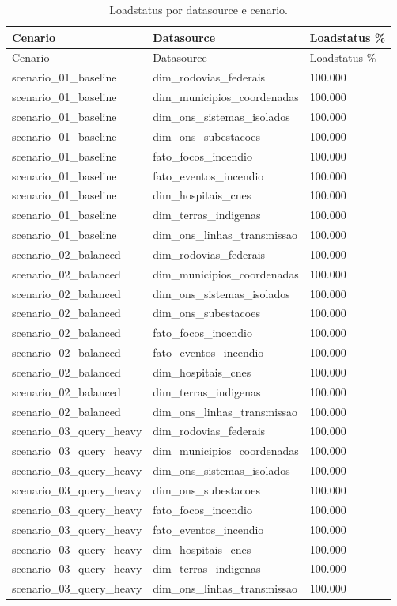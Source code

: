 {
\small
\setlength{\tabcolsep}{4pt}
\renewcommand{\arraystretch}{1.15}
\begin{longtable}{p{}p{}p{}}
\caption{Loadstatus por datasource e cenario.}\\
\toprule
Cenario & Datasource & Loadstatus \% \\
\midrule
\endfirsthead
\toprule
Cenario & Datasource & Loadstatus \% \\
\midrule
\endhead
scenario\_01\_baseline & dim\_rodovias\_federais & 100.000 \\
scenario\_01\_baseline & dim\_municipios\_coordenadas & 100.000 \\
scenario\_01\_baseline & dim\_ons\_sistemas\_isolados & 100.000 \\
scenario\_01\_baseline & dim\_ons\_subestacoes & 100.000 \\
scenario\_01\_baseline & fato\_focos\_incendio & 100.000 \\
scenario\_01\_baseline & fato\_eventos\_incendio & 100.000 \\
scenario\_01\_baseline & dim\_hospitais\_cnes & 100.000 \\
scenario\_01\_baseline & dim\_terras\_indigenas & 100.000 \\
scenario\_01\_baseline & dim\_ons\_linhas\_transmissao & 100.000 \\
scenario\_02\_balanced & dim\_rodovias\_federais & 100.000 \\
scenario\_02\_balanced & dim\_municipios\_coordenadas & 100.000 \\
scenario\_02\_balanced & dim\_ons\_sistemas\_isolados & 100.000 \\
scenario\_02\_balanced & dim\_ons\_subestacoes & 100.000 \\
scenario\_02\_balanced & fato\_focos\_incendio & 100.000 \\
scenario\_02\_balanced & fato\_eventos\_incendio & 100.000 \\
scenario\_02\_balanced & dim\_hospitais\_cnes & 100.000 \\
scenario\_02\_balanced & dim\_terras\_indigenas & 100.000 \\
scenario\_02\_balanced & dim\_ons\_linhas\_transmissao & 100.000 \\
scenario\_03\_query\_heavy & dim\_rodovias\_federais & 100.000 \\
scenario\_03\_query\_heavy & dim\_municipios\_coordenadas & 100.000 \\
scenario\_03\_query\_heavy & dim\_ons\_sistemas\_isolados & 100.000 \\
scenario\_03\_query\_heavy & dim\_ons\_subestacoes & 100.000 \\
scenario\_03\_query\_heavy & fato\_focos\_incendio & 100.000 \\
scenario\_03\_query\_heavy & fato\_eventos\_incendio & 100.000 \\
scenario\_03\_query\_heavy & dim\_hospitais\_cnes & 100.000 \\
scenario\_03\_query\_heavy & dim\_terras\_indigenas & 100.000 \\
scenario\_03\_query\_heavy & dim\_ons\_linhas\_transmissao & 100.000 \\
\bottomrule
\end{longtable}
}
